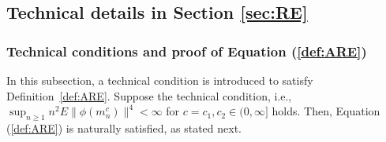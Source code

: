 \documentclass[preprint]{imsart}
\theoremstyle{plain}
\theoremstyle{remark}
\begin{document}
\begin{appendix}
\subsection{Technical details in Section \ref{sec:RE}}



\subsubsection{Technical conditions and proof of Equation (\ref{def:ARE})}


In this subsection, a technical condition is introduced to satisfy Definition~\ref{def:ARE}. Suppose the technical condition, i.e., $\sup_{n \ge 1}n^2 E \|\phi(m^{c}_{n}) \|^4 < \infty$ for $c=c_{1}, c_{2} \in (0, \infty]$ holds. Then, Equation (\ref{def:ARE}) is naturally satisfied, as stated next. 


\end{appendix}
\end{document}
